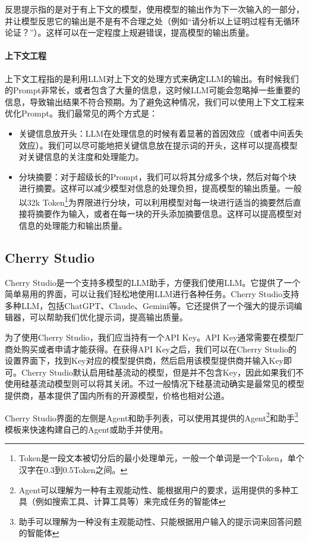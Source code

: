 反思提示指的是对于有上下文的模型，使用模型的输出作为下一次输入的一部分，并让模型反思它的输出是不是有不合理之处（例如“请分析以上证明过程有无循环论证？”）。这样可以在一定程度上规避错误，提高模型的输出质量。

\paragraph{上下文工程}

上下文工程指的是利用LLM对上下文的处理方式来确定LLM的输出。有时候我们的Prompt非常长，或者包含了大量的信息，这时候LLM可能会忽略掉一些重要的信息，导致输出结果不符合预期。为了避免这种情况，我们可以使用上下文工程来优化Prompt。我们最常见的两个方式是：
\begin{itemize}
  \item 关键信息放开头：LLM在处理信息的时候有着显著的首因效应（或者中间丢失效应）。我们可以尽可能地把关键信息放在提示词的开头，这样可以提高模型对关键信息的关注度和处理能力。
  \item 分块摘要：对于超级长的Prompt，我们可以将其分成多个块，然后对每个块进行摘要。这样可以减少模型对信息的处理负担，提高模型的输出质量。一般以32k Token\footnote{Token是一段文本被切分后的最小处理单元，一般一个单词是一个Token，单个汉字在0.3到0.5Token之间。}为界限进行分块，可以利用模型对每一块进行适当的摘要然后直接将摘要作为输入，或者在每一块的开头添加摘要信息。这样可以提高模型对信息的处理能力和输出质量。
\end{itemize}

\subsection{Cherry Studio}

Cherry Studio是一个支持多模型的LLM助手，方便我们使用LLM。它提供了一个简单易用的界面，可以让我们轻松地使用LLM进行各种任务。Cherry Studio支持多种LLM，包括ChatGPT、Claude、Gemini等。它还提供了一个强大的提示词编辑器，可以帮助我们优化提示词，提高输出质量。

为了使用Cherry Studio，我们应当持有一个API Key。API Key通常需要在模型厂商处购买或者申请才能获得。在获得API Key之后，我们可以在Cherry Studio的设置界面下，找到Key对应的模型提供商，然后启用该模型提供商并输入Key即可。Cherry Studio默认启用硅基流动的模型，但是并不包含Key，因此如果我们不使用硅基流动模型则可以将其关闭。不过一般情况下硅基流动确实是最常见的模型提供商，基本提供了国内所有的开源模型，价格也相对公道。

Cherry Studio界面的左侧是Agent和助手列表，可以使用其提供的Agent\footnote{Agent可以理解为一种有主观能动性、能根据用户的要求，运用提供的多种工具（例如搜索工具、计算工具等）来完成任务的智能体}和助手\footnote{助手可以理解为一种没有主观能动性、只能根据用户输入的提示词来回答问题的智能体}模板来快速构建自己的Agent或助手并使用。

